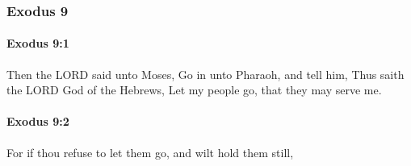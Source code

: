 	\subsubsection{Exodus 9} %
		\label{EXODUS-9}

		\paragraph{Exodus 9:1} %
			\label{EXODUS-9-1}

			Then the LORD said unto Moses, Go in unto Pharaoh, and tell him, Thus saith the LORD God of the Hebrews, Let my people go, that they may serve me.


		\paragraph{Exodus 9:2} %
			\label{EXODUS-9-2}

			For if thou refuse to let them go, and wilt hold them still,

